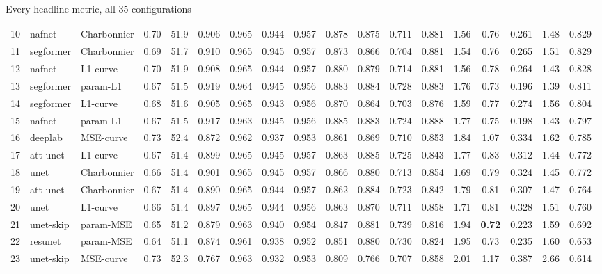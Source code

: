 \begin{frame}{Every headline metric, all 35 configurations}
\begin{tabular}{@{}r l l c c c c c c c c c c c c c c c@{}}
    10 & nafnet & Charbonnier & 0.70 & 51.9 & 0.906 & 0.965 & 0.944 & 0.957 & 0.878 & 0.875 & 0.711 & 0.881 & 1.56 & 0.76 & 0.261 & 1.48 & 0.829 \\
    11 & segformer & Charbonnier & 0.69 & 51.7 & 0.910 & 0.965 & 0.945 & 0.957 & 0.873 & 0.866 & 0.704 & 0.881 & 1.54 & 0.76 & 0.265 & 1.51 & 0.829 \\
    12 & nafnet & L1-curve & 0.70 & 51.9 & 0.908 & 0.965 & 0.944 & 0.957 & 0.880 & 0.879 & 0.714 & 0.881 & 1.56 & 0.78 & 0.264 & 1.43 & 0.828 \\
    13 & segformer & param-L1 & 0.67 & 51.5 & 0.919 & 0.964 & 0.945 & 0.956 & 0.883 & 0.884 & 0.728 & 0.883 & 1.76 & 0.73 & 0.196 & 1.39 & 0.811 \\
    14 & segformer & L1-curve & 0.68 & 51.6 & 0.905 & 0.965 & 0.943 & 0.956 & 0.870 & 0.864 & 0.703 & 0.876 & 1.59 & 0.77 & 0.274 & 1.56 & 0.804 \\
    15 & nafnet & param-L1 & 0.67 & 51.5 & 0.917 & 0.963 & 0.945 & 0.956 & 0.885 & 0.883 & 0.724 & 0.888 & 1.77 & 0.75 & 0.198 & 1.43 & 0.797 \\
    \rowcolor{soft!18} 16 & deeplab & MSE-curve & 0.73 & 52.4 & 0.872 & 0.962 & 0.937 & 0.953 & 0.861 & 0.869 & 0.710 & 0.853 & 1.84 & 1.07 & 0.334 & 1.62 & 0.785 \\
    17 & att-unet & L1-curve & 0.67 & 51.4 & 0.899 & 0.965 & 0.945 & 0.957 & 0.863 & 0.885 & 0.725 & 0.843 & 1.77 & 0.83 & 0.312 & 1.44 & 0.772 \\
    18 & unet & Charbonnier & 0.66 & 51.4 & 0.901 & 0.965 & 0.945 & 0.957 & 0.866 & 0.880 & 0.713 & 0.854 & 1.69 & 0.79 & 0.324 & 1.45 & 0.772 \\
    19 & att-unet & Charbonnier & 0.67 & 51.4 & 0.890 & 0.965 & 0.944 & 0.957 & 0.862 & 0.884 & 0.723 & 0.842 & 1.79 & 0.81 & 0.307 & 1.47 & 0.764 \\
    20 & unet & L1-curve & 0.66 & 51.4 & 0.897 & 0.965 & 0.944 & 0.956 & 0.863 & 0.870 & 0.711 & 0.858 & 1.71 & 0.81 & 0.328 & 1.51 & 0.760 \\
    \rowcolor{soft!18} 21 & unet-skip & param-MSE & 0.65 & 51.2 & 0.879 & 0.963 & 0.940 & 0.954 & 0.847 & 0.881 & 0.739 & 0.816 & 1.94 & \textbf{0.72} & 0.223 & 1.59 & 0.692 \\
    \rowcolor{soft!18} 22 & resunet & param-MSE & 0.64 & 51.1 & 0.874 & 0.961 & 0.938 & 0.952 & 0.851 & 0.880 & 0.730 & 0.824 & 1.95 & 0.73 & 0.235 & 1.60 & 0.653 \\
    \rowcolor{soft!18} 23 & unet-skip & MSE-curve & 0.73 & 52.3 & 0.767 & 0.963 & 0.932 & 0.953 & 0.809 & 0.766 & 0.707 & 0.858 & 2.01 & 1.17 & 0.387 & 2.66 & 0.614 \\

\end{tabular}
\end{frame}

